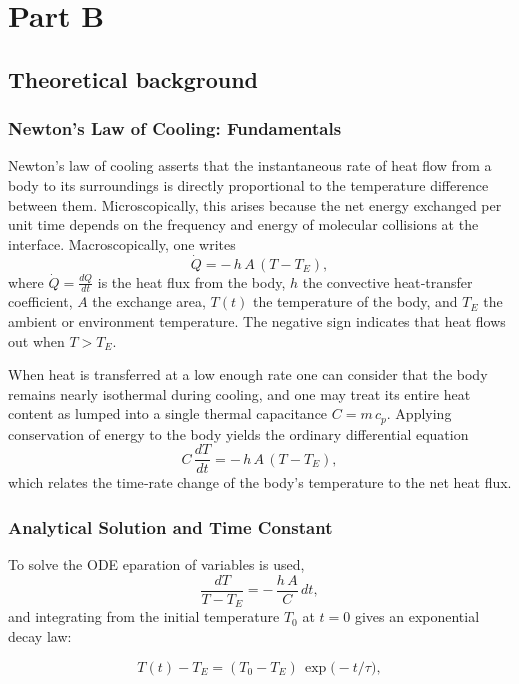 \documentclass[12pt,a4paper]{report}
\begin{document}
\tableofcontents
\setcounter{chapter}{1}
\chapter{Part B}
\section{Theoretical background}


\subsection{Newton’s Law of Cooling: Fundamentals}
Newton’s law of cooling asserts that the instantaneous rate of heat flow from a body to its surroundings is directly proportional to the temperature difference between them. Microscopically, this arises because the net energy exchanged per unit time depends on the frequency and energy of molecular collisions at the interface. Macroscopically, one writes
\begin{equation}
    \dot{Q} = -\,h\,A\,(T - T_E),
\end{equation}
where $\dot{Q} = \frac{dQ}{dt}$ is the heat flux from the body, $h$ the convective heat‐transfer coefficient, $A$ the exchange area, $T(t)$ the temperature of the body, and $T_E$ the ambient or environment temperature. The negative sign indicates that heat flows out when $T>T_E$.


 When heat is transferred at a low enough rate one can consider that the body remains nearly isothermal during cooling, and one may treat its entire heat content as lumped into a single thermal capacitance $C=m\,c_p$. Applying conservation of energy to the body yields the ordinary differential equation
\[
C\,\frac{dT}{dt} = -\,h\,A\,(T - T_E),
\]
which relates the time‐rate change of the body’s temperature to the net heat flux.

\subsection{Analytical Solution and Time Constant}
To solve the ODE eparation of variables is used,
\[
\frac{dT}{T - T_E} = -\,\frac{h\,A}{C}\,dt,
\]
and integrating from the initial temperature $T_0$ at $t=0$ gives an exponential decay law:

\begin{equation} \label{T_v_t_exponential}
    T(t) - T_E = (T_0 - T_E)\,\exp\!\bigl(-t/\tau\bigr),
\end{equation}
\end{document}
